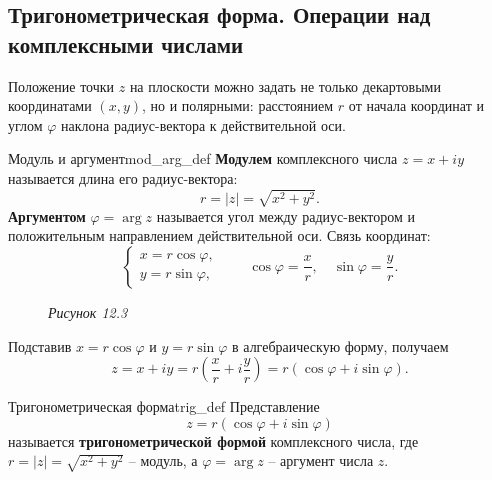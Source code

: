 \documentclass[12pt,a4paper]{article}
\begin{document}
\subsection*{Тригонометрическая форма. Операции над комплексными числами}

Положение точки $z$ на плоскости можно задать не только декартовыми
координатами $(x, y)$, но и полярными: расстоянием $r$ от начала
координат и углом $\varphi$ наклона радиус-вектора к действительной оси.

\begin{definition}{Модуль и аргумент}{mod_arg_def}
  \textbf{Модулем} комплексного числа $z = x + iy$ называется длина его
  радиус-вектора:
  \[
    r = |z| = \sqrt{x^2 + y^2}.
  \]
  \textbf{Аргументом} $\varphi = \arg z$ называется угол между
  радиус-вектором и положительным направлением действительной оси.
  Связь координат:
  \[
    \begin{cases} x = r\cos\varphi, \\ y = r\sin\varphi,
    \end{cases}
    \qquad
    \cos\varphi = \frac{x}{r}, \quad \sin\varphi = \frac{y}{r}.
  \]
\end{definition}

\begin{figure}[H]
  \centering

  \smallskip
  \textit{Рисунок 12.3}
\end{figure}

Подставив $x = r\cos\varphi$ и $y = r\sin\varphi$ в алгебраическую
форму, получаем
\[
  z = x + iy = r\!\left(\frac{x}{r} + i\frac{y}{r}\right)
  = r(\cos\varphi + i\sin\varphi).
\]

\begin{definition}{Тригонометрическая форма}{trig_def}
  Представление
  \[
    z = r(\cos\varphi + i\sin\varphi)
  \]
  называется \textbf{тригонометрической формой} комплексного числа,
  где $r = |z| = \sqrt{x^2 + y^2}$ -- модуль, а $\varphi = \arg z$ --
  аргумент числа $z$.
\end{definition}
\end{document}
